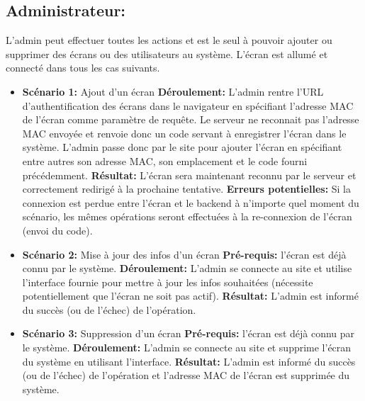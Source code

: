 \documentclass[french]{article}
\begin{document}
	\subsection{Administrateur:}
	L'admin peut effectuer toutes les actions et est le seul à pouvoir ajouter ou supprimer des écrans ou des utilisateurs au système. L'écran est allumé et connecté dans tous les cas suivants. \newline
		\begin{itemize}
		\item \textbf{Scénario 1:} Ajout d'un écran\newline
		\textbf{Déroulement:} L'admin rentre l'URL d'authentification des écrans dans le navigateur en spécifiant l'adresse MAC de l'écran comme paramètre de requête. Le serveur ne reconnait pas l'adresse MAC envoyée et renvoie donc un code servant à enregistrer l'écran dans le système. L'admin passe donc par le site pour ajouter l'écran en spécifiant entre autres son adresse MAC, son emplacement et le code fourni précédemment.\newline
		\textbf{Résultat:} L'écran sera maintenant reconnu par le serveur et correctement redirigé à la prochaine tentative.\newline
		\textbf{Erreurs potentielles:} Si la connexion est perdue entre l'écran et le backend à n'importe quel moment du scénario, les mêmes opérations seront effectuées à la re-connexion de l'écran (envoi du code). \newline
		
		\item \textbf{Scénario 2:} Mise à jour des infos d'un écran\newline
		\textbf{Pré-requis:} l'écran est déjà connu par le système.\newline
		\textbf{Déroulement:} L'admin se connecte au site et utilise l'interface fournie pour mettre à jour les infos souhaitées (nécessite potentiellement que l'écran ne soit pas actif).\newline
		\textbf{Résultat:} L'admin est informé du succès (ou de l'échec) de l'opération.\newline
		
		\item \textbf{Scénario 3:} Suppression d'un écran\newline
		\textbf{Pré-requis:} l'écran est déjà connu par le système.\newline
		\textbf{Déroulement:} L'admin se connecte au site et supprime l'écran du système en utilisant l'interface.\newline
		\textbf{Résultat:} L'admin est informé du succès (ou de l'échec) de l'opération et l'adresse MAC de l'écran est supprimée du système.\newline


\end{itemize}
\end{document}
